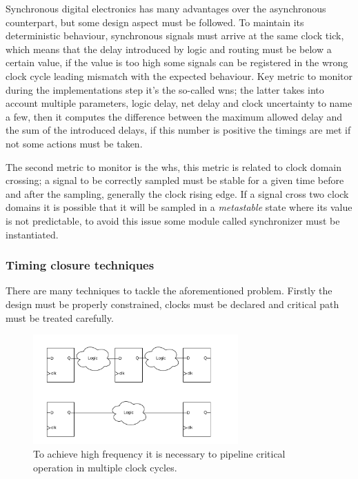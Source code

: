 \documentclass[../../main.tex]{subfiles}
\begin{document}
Synchronous digital electronics has many advantages over the asynchronous counterpart, but some design aspect must be followed. To maintain its deterministic behaviour, synchronous signals must arrive at the same clock tick, which means that the delay introduced by logic and routing must be below a certain value, if the value is too high some signals can be registered in the wrong clock cycle leading mismatch with the expected behaviour.
Key metric to monitor during the implementations step it's the so-called \acrfull{wns}; the latter takes into account multiple parameters, logic delay, net delay and  clock uncertainty to name a few, then it computes the difference between the maximum allowed delay and the sum of the introduced delays, if this number is positive the timings are met if not some actions must be taken.  
        
The second metric to monitor is the \acrfull{whs}, this metric is related to clock domain crossing; a signal to be correctly sampled must be stable for a given time before and after the sampling, generally  the clock rising edge. If a signal cross two clock domains it is possible that it will be sampled in a \textit{metastable} state where its value is not predictable, to avoid this issue some module called synchronizer must be instantiated.  
        
\subsubsection{Timing closure techniques}

There are many techniques to tackle the aforementioned problem.  
Firstly the design must be properly constrained, clocks must be declared and critical path must be treated carefully. 

\begin{figure}[h]
    \centering
    \includegraphics[width=0.7\textwidth]{sections/04/Images/FF_piplineing.pdf}
    \caption{To achieve high frequency it is necessary to pipeline critical operation in multiple clock cycles.}
    \label{fig:FF_pipline}
\end{figure}
\end{document}
